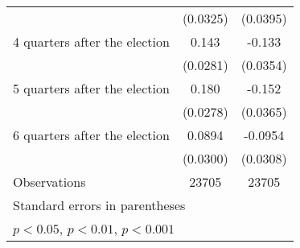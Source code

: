 \begin{table}[htbp]
\begin{tabular}{l*{2}{c}}
                    &    (0.0325)         &    (0.0395)         \\
[1em]
 4 quarters after the election&       0.143\sym{***}&      -0.133\sym{***}\\
                    &    (0.0281)         &    (0.0354)         \\
[1em]
 5 quarters after the election&       0.180\sym{***}&      -0.152\sym{***}\\
                    &    (0.0278)         &    (0.0365)         \\
[1em]
 6 quarters after the election&      0.0894\sym{**} &     -0.0954\sym{**} \\
                    &    (0.0300)         &    (0.0308)         \\
\hline
Observations        &       23705         &       23705         \\
\hline\hline
\multicolumn{3}{l}{\footnotesize Standard errors in parentheses}\\
\multicolumn{3}{l}{\footnotesize \sym{*} \(p<0.05\), \sym{**} \(p<0.01\), \sym{***} \(p<0.001\)}\\
\end{tabular}
\end{table}
